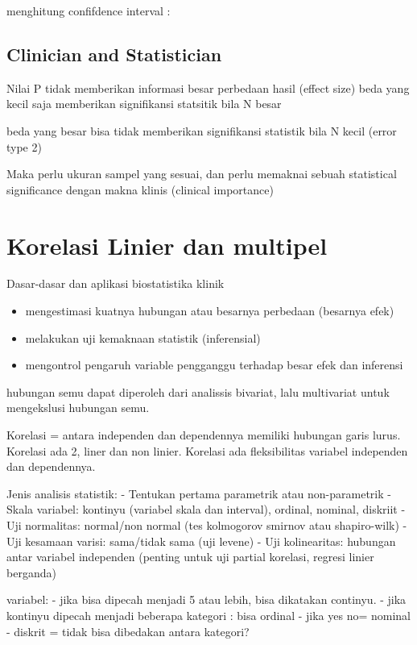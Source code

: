 \documentclass[
  letterpaper,
  DIV=11,
  numbers=noendperiod]{scrreprt}
\providecommand{\tightlist}{%
  \setlength{\itemsep}{0pt}\setlength{\parskip}{0pt}}\usepackage{longtable,booktabs,array}
\begin{document}
menghitung confifdence interval :

\subsection{Clinician and
Statistician}\label{clinician-and-statistician}

Nilai P tidak memberikan informasi besar perbedaan hasil (effect size)
beda yang kecil saja memberikan signifikansi statsitik bila N besar

beda yang besar bisa tidak memberikan signifikansi statistik bila N
kecil (error type 2)

Maka perlu ukuran sampel yang sesuai, dan perlu memaknai sebuah
statistical significance dengan makna klinis (clinical importance)

\section{Korelasi Linier dan
multipel}\label{korelasi-linier-dan-multipel}

Dasar-dasar dan aplikasi biostatistika klinik

\begin{itemize}
\tightlist
\item
  mengestimasi kuatnya hubungan atau besarnya perbedaan (besarnya efek)
\item
  melakukan uji kemaknaan statistik (inferensial)
\item
  mengontrol pengaruh variable pengganggu terhadap besar efek dan
  inferensi
\end{itemize}

hubungan semu dapat diperoleh dari analissis bivariat, lalu multivariat
untuk mengekslusi hubungan semu.

Korelasi = antara independen dan dependennya memiliki hubungan garis
lurus. Korelasi ada 2, liner dan non linier. Korelasi ada fleksibilitas
variabel independen dan dependennya.

Jenis analisis statistik: - Tentukan pertama parametrik atau
non-parametrik - Skala variabel: kontinyu (variabel skala dan interval),
ordinal, nominal, diskriit - Uji normalitas: normal/non normal (tes
kolmogorov smirnov atau shapiro-wilk) - Uji kesamaan varisi: sama/tidak
sama (uji levene) - Uji kolinearitas: hubungan antar variabel independen
(penting untuk uji partial korelasi, regresi linier berganda)

variabel: - jika bisa dipecah menjadi 5 atau lebih, bisa dikatakan
continyu. - jika kontinyu dipecah menjadi beberapa kategori : bisa
ordinal - jika yes no= nominal - diskrit = tidak bisa dibedakan antara
kategori?
\end{document}
